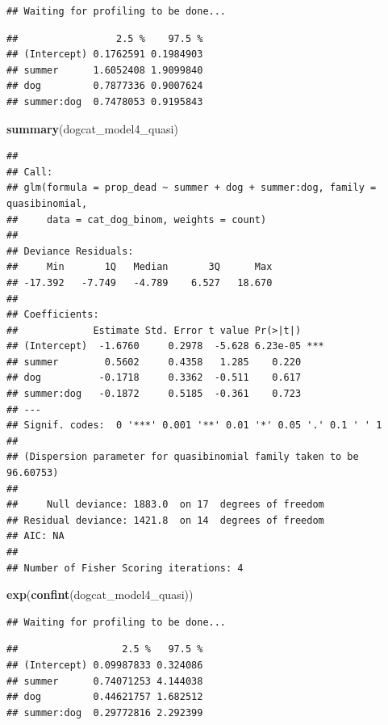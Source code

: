 \documentclass[]{article}
\newenvironment{Shaded}{\begin{snugshade}}{\end{snugshade}}
\newcommand{\KeywordTok}[1]{\textcolor[rgb]{0.13,0.29,0.53}{\textbf{#1}}}
\newcommand{\NormalTok}[1]{#1}
\begin{document}
\begin{verbatim}
## Waiting for profiling to be done...
\end{verbatim}

\begin{verbatim}
##                 2.5 %    97.5 %
## (Intercept) 0.1762591 0.1984903
## summer      1.6052408 1.9099840
## dog         0.7877336 0.9007624
## summer:dog  0.7478053 0.9195843
\end{verbatim}

\begin{Shaded}
\begin{Highlighting}[]
\KeywordTok{summary}\NormalTok{(dogcat_model4_quasi)}
\end{Highlighting}
\end{Shaded}

\begin{verbatim}
## 
## Call:
## glm(formula = prop_dead ~ summer + dog + summer:dog, family = quasibinomial, 
##     data = cat_dog_binom, weights = count)
## 
## Deviance Residuals: 
##     Min       1Q   Median       3Q      Max  
## -17.392   -7.749   -4.789    6.527   18.670  
## 
## Coefficients:
##             Estimate Std. Error t value Pr(>|t|)    
## (Intercept)  -1.6760     0.2978  -5.628 6.23e-05 ***
## summer        0.5602     0.4358   1.285    0.220    
## dog          -0.1718     0.3362  -0.511    0.617    
## summer:dog   -0.1872     0.5185  -0.361    0.723    
## ---
## Signif. codes:  0 '***' 0.001 '**' 0.01 '*' 0.05 '.' 0.1 ' ' 1
## 
## (Dispersion parameter for quasibinomial family taken to be 96.60753)
## 
##     Null deviance: 1883.0  on 17  degrees of freedom
## Residual deviance: 1421.8  on 14  degrees of freedom
## AIC: NA
## 
## Number of Fisher Scoring iterations: 4
\end{verbatim}

\begin{Shaded}
\begin{Highlighting}[]
\KeywordTok{exp}\NormalTok{(}\KeywordTok{confint}\NormalTok{(dogcat_model4_quasi))}
\end{Highlighting}
\end{Shaded}

\begin{verbatim}
## Waiting for profiling to be done...
\end{verbatim}

\begin{verbatim}
##                  2.5 %   97.5 %
## (Intercept) 0.09987833 0.324086
## summer      0.74071253 4.144038
## dog         0.44621757 1.682512
## summer:dog  0.29772816 2.292399
\end{verbatim}
\end{document}
